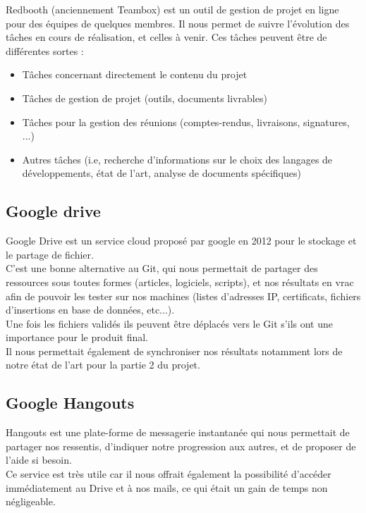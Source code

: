 Redbooth (anciennement Teambox) \cite{teambox} est un outil de gestion de projet en ligne pour des équipes de quelques membres. Il nous permet de suivre l'évolution des tâches en cours de réalisation, et celles à venir. Ces tâches peuvent être de différentes sortes :
\begin{itemize}
\item Tâches concernant directement le contenu du projet
\item Tâches de gestion de projet (outils, documents livrables)
\item Tâches pour la gestion des réunions (comptes-rendus, livraisons, signatures, ...)
\item Autres tâches (i.e, recherche d'informations sur le choix des langages de développements, état de l'art, analyse de documents spécifiques)
\end{itemize}

\subsection{Google drive}

Google Drive est un service cloud proposé par google en 2012 pour le stockage et le partage de fichier.\\
C'est une bonne alternative au Git, qui nous permettait de partager des ressources sous toutes formes (articles, logiciels, scripts), et nos résultats en vrac afin de pouvoir les tester sur nos machines (listes d'adresses IP, certificats, fichiers d'insertions en base de données, etc...).\\
Une fois les fichiers validés ils peuvent être déplacés vers le Git s'ils ont une importance pour le produit final.\\
Il nous permettait également de synchroniser nos résultats notamment lors de notre état de l'art pour la partie 2 du projet.

\subsection{Google Hangouts}

Hangouts est une plate-forme de messagerie instantanée qui nous permettait de partager nos ressentis, d'indiquer notre progression aux autres, et de proposer de l'aide si besoin.\\
Ce service est très utile car il nous offrait également la possibilité d'accéder immédiatement au Drive et à nos mails, ce qui était un gain de temps non négligeable.

